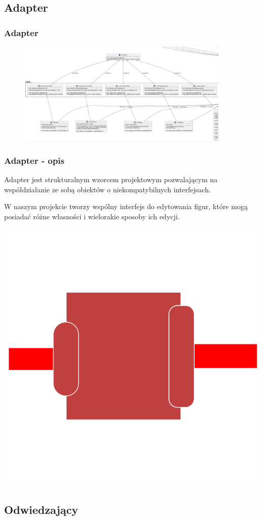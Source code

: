 \documentclass[
	11pt,]{beamer}
\begin{document}
\subsection{Adapter}

\begin{frame}
	\frametitle{Adapter}
	
	\begin{figure}
		\includegraphics[width=0.9\textwidth]{figures/adapter.pdf}
	\end{figure}
\end{frame}

\begin{frame}
	\frametitle{Adapter - opis}
	Adapter jest strukturalnym wzorcem projektowym pozwalającym na współdziałanie ze sobą obiektów o niekompatybilnych interfejsach.
	
	\vfill
	
	W naszym projekcie tworzy wspólny interfejs do edytowania figur, które mogą posiadać różne własności i wielorakie sposoby ich edycji.
	
	\begin{center}
    	\includegraphics[width=.25\textwidth]{figures/adapter.png}
    \end{center}
\end{frame}

\subsection{Odwiedzający}
\end{document}
